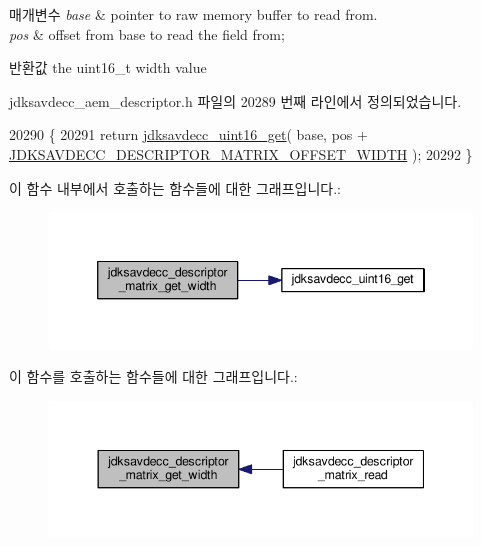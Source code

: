 \begin{DoxyParams}{매개변수}
{\em base} & pointer to raw memory buffer to read from. \\
\hline
{\em pos} & offset from base to read the field from; \\
\hline
\end{DoxyParams}
\begin{DoxyReturn}{반환값}
the uint16\+\_\+t width value 
\end{DoxyReturn}


jdksavdecc\+\_\+aem\+\_\+descriptor.\+h 파일의 20289 번째 라인에서 정의되었습니다.


\begin{DoxyCode}
20290 \{
20291     \textcolor{keywordflow}{return} \hyperlink{group__endian_ga3fbbbc20be954aa61e039872965b0dc9}{jdksavdecc\_uint16\_get}( base, pos + 
      \hyperlink{group__descriptor__matrix_ga774df646aeb5e112925fad995dec7cf8}{JDKSAVDECC\_DESCRIPTOR\_MATRIX\_OFFSET\_WIDTH} );
20292 \}
\end{DoxyCode}


이 함수 내부에서 호출하는 함수들에 대한 그래프입니다.\+:
\nopagebreak
\begin{figure}[H]
\begin{center}
\leavevmode
\includegraphics[width=346pt]{group__descriptor__matrix_ga6459143f0bffb2ae98d4d4964cd7fb40_cgraph}
\end{center}
\end{figure}




이 함수를 호출하는 함수들에 대한 그래프입니다.\+:
\nopagebreak
\begin{figure}[H]
\begin{center}
\leavevmode
\includegraphics[width=344pt]{group__descriptor__matrix_ga6459143f0bffb2ae98d4d4964cd7fb40_icgraph}
\end{center}
\end{figure}


